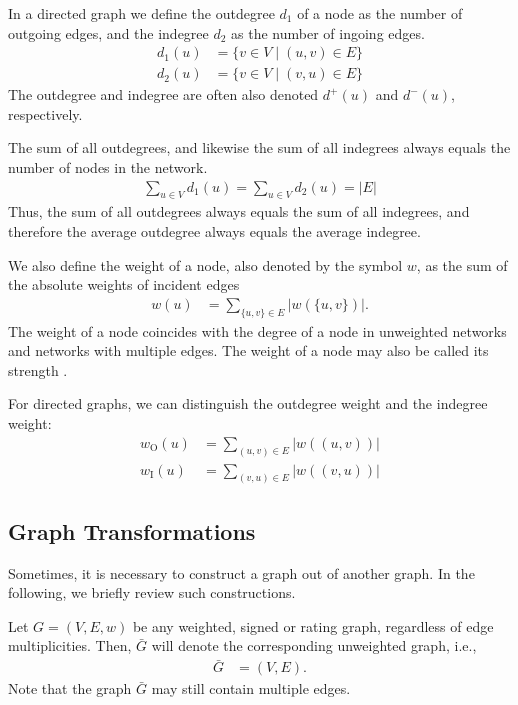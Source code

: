 \documentclass{article}
\begin{document}
In a directed graph we define the outdegree $d_1$ of a node as the number of
outgoing edges, and the indegree $d_2$ as the number of ingoing edges.
\begin{align}
  d_1(u) &= \{ v \in V \mid (u,v) \in E \} \\
  d_2(u) &= \{ v \in V \mid (v,u) \in E \}
\end{align}
The outdegree and indegree are often also denoted $d^+(u)$ and
$d^-(u)$, respectively. 

The sum of all outdegrees, and likewise the sum of all indegrees always
equals the number of nodes in the network.  
\begin{align}
  \sum_{u\in V} d_1(u) = \sum_{u \in V} d_2(u) = |E|
\end{align}
Thus, the sum of all outdegrees always equals the sum of all indegrees,
and therefore the average outdegree always equals the average indegree.  

We also define the weight of a node, also denoted by the symbol $w$, as
the sum of the absolute weights of incident edges
\begin{align}
  w(u) &= \sum_{ \{u,v\} \in E} |w(\{u,v\})|. 
\end{align}
The weight of a node coincides with the degree of a node in unweighted
networks and networks with multiple edges. 
The weight of a node may also be called its strength \citep{b792}. 

For directed graphs, we can distinguish the outdegree weight and the
indegree weight:
\begin{align}
  w_{\mathrm O}(u) &= \sum_{(u,v)\in E} |w((u,v))| \\
  w_{\mathrm I}(u) &= \sum_{(v,u)\in E} |w((v,u))| 
\end{align}

\subsection{Graph Transformations}
Sometimes, it is necessary to construct a graph out of another graph.
In the following, we briefly review such constructions.  

Let $G=(V,E,w)$ be any weighted, signed or rating graph, regardless of
edge multiplicities.  Then, $\bar G$ will denote the corresponding
unweighted graph, i.e.,
\begin{align}
  \bar G &= (V,E).
\end{align}
Note that the graph $\bar G$ may still contain multiple edges. 
\end{document}
